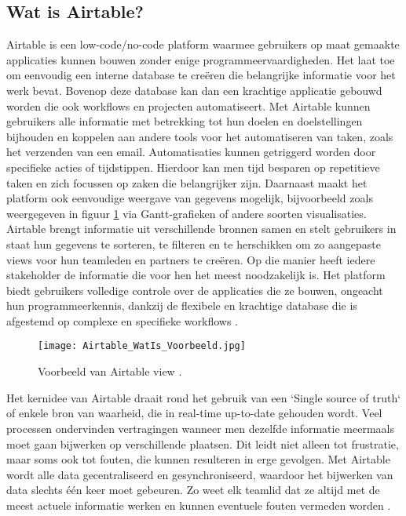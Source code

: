 \subsection{Wat is Airtable?}
\label{subsec:wat_is_airtable}

Airtable is een low-code/no-code platform waarmee gebruikers op maat gemaakte applicaties kunnen bouwen zonder enige programmeervaardigheden. Het laat toe om eenvoudig een interne database te creëren die belangrijke informatie voor het werk bevat. Bovenop deze database kan dan een krachtige applicatie gebouwd worden die ook workflows en projecten automatiseert. Met Airtable kunnen gebruikers alle informatie met betrekking tot hun doelen en doelstellingen bijhouden en koppelen aan andere tools voor het automatiseren van taken, zoals het verzenden van een email. Automatisaties kunnen getriggerd worden door specifieke acties of tijdstippen. Hierdoor kan men tijd besparen op repetitieve taken en zich focussen op zaken die belangrijker zijn. Daarnaast maakt het platform ook eenvoudige weergave van gegevens mogelijk, bijvoorbeeld zoals weergegeven in figuur \ref{fig:exampleairtable} via Gantt-grafieken of andere soorten visualisaties. Airtable brengt informatie uit verschillende bronnen samen en stelt gebruikers in staat hun gegevens te sorteren, te filteren en te herschikken om zo aangepaste views voor hun teamleden en partners te creëren. Op die manier heeft iedere stakeholder de informatie die voor hen het meest noodzakelijk is. Het platform biedt gebruikers volledige controle over de applicaties die ze bouwen, ongeacht hun programmeerkennis, dankzij de flexibele en krachtige database die is afgestemd op complexe en specifieke workflows \autocite{AirtableWhat}. \\

\begin{figure}[h]
    \centering
    \texttt{[image: Airtable\_WatIs\_Voorbeeld.jpg]}
    \caption[Voorbeeld Airtable View]{Voorbeeld van Airtable view \autocite{AirtableWhat}.}
    \label{fig:exampleairtable}
\end{figure}

Het kernidee van Airtable draait rond het gebruik van een `Single source of truth` of enkele bron van waarheid, die in real-time up-to-date gehouden wordt. Veel processen ondervinden vertragingen 
wanneer men dezelfde informatie meermaals moet gaan bijwerken op verschillende plaatsen. Dit leidt niet alleen tot frustratie, maar soms ook tot fouten, die kunnen resulteren in erge gevolgen. Met Airtable wordt alle data gecentraliseerd en gesynchroniseerd, waardoor het bijwerken van data slechts één keer moet gebeuren. Zo weet elk teamlid dat ze altijd met de meest actuele informatie werken en kunnen eventuele fouten vermeden worden \autocite{AirtableWhat}. \\

